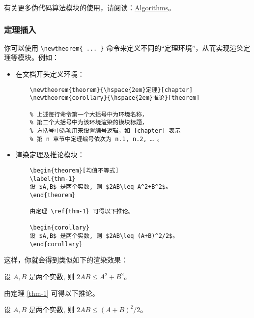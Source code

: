 有关更多伪代码算法模块的使用，请阅读：\href{https://www.overleaf.com/learn/latex/algorithms}{Algorithms}。

\subsubsection{定理插入}

你可以使用 \verb|\newtheorem{ ... }| 命令来定义不同的“定理环境”，从而实现渲染定理等模块。例如：

\begin{itemize}
  \item 在文档开头定义环境：
        \begin{verbatim}
    \newtheorem{theorem}{\hspace{2em}定理}[chapter]
    \newtheorem{corollary}{\hspace{2em}推论}[theorem]

    % 上述每行命令第一个大括号中为环境名称，
    % 第二个大括号中为该环境渲染的模块标题，
    % 方括号中选项用来设置编号逻辑，如 [chapter] 表示
    % 第 n 章节中定理编号依次为 n.1, n.2, … 。
  \end{verbatim}
  \item 渲染定理及推论模块：
        \begin{verbatim}
    \begin{theorem}[均值不等式]
    \label{thm-1}
    设 $A,B$ 是两个实数, 则 $2AB\leq A^2+B^2$。
    \end{theorem}

    由定理 \ref{thm-1} 可得以下推论。

    \begin{corollary}
    设 $A,B$ 是两个实数, 则 $2AB\leq (A+B)^2/2$。
    \end{corollary}
  \end{verbatim}
\end{itemize}

这样，你就会得到类似如下的渲染效果：

\begin{framed}
\begin{theorem}[均值不等式]
  \label{thm-1}
  设 $A,B$ 是两个实数, 则 $2AB\leq A^2+B^2$。
\end{theorem}

由定理 \ref{thm-1} 可得以下推论。

\begin{corollary}
  设 $A,B$ 是两个实数, 则 $2AB\leq (A+B)^2/2$。
\end{corollary}
\end{framed}


